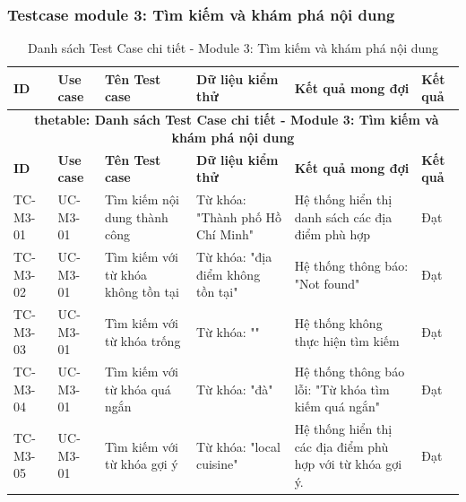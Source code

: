 \subsubsection{Testcase module 3: Tìm kiếm và khám phá nội dung}

\hypertarget{target:tc_m3}{}
\begin{landscape}
\small 
\begin{longtable}{|p{2.2cm}|p{2.2cm}|p{4cm}|p{4.5cm}|p{6cm}|p{2cm}|}
    
\caption{Danh sách Test Case chi tiết - Module 3: Tìm kiếm và khám phá nội dung} \label{tab:tc_module3} \\
\hline
\textbf{ID} & \textbf{ Use case} & \textbf{Tên Test case} & \textbf{Dữ liệu kiểm thử} & \textbf{Kết quả mong đợi} & \textbf{Kết quả } \\
\hline
\endfirsthead

\multicolumn{6}{c}{{\bfseries \tablename\ thetable{}: Danh sách Test Case chi tiết - Module 3: Tìm kiếm và khám phá nội dung}} \\
\hline
\textbf{ID} & \textbf{ Use case} & \textbf{Tên Test case} & \textbf{Dữ liệu kiểm thử} & \textbf{Kết quả mong đợi} & \textbf{Kết quả } \\
\hline
\endhead

\hline
\endlastfoot


TC-M3-01 & UC-M3-01 & Tìm kiếm nội dung thành công & 
Từ khóa: "Thành phố Hồ Chí Minh" & 
Hệ thống hiển thị danh sách các địa điểm phù hợp & Đạt\\
\hline

TC-M3-02 & UC-M3-01 & Tìm kiếm với từ khóa không tồn tại & 
Từ khóa: "địa điểm không tồn tại" & 
Hệ thống thông báo: "Not found" & Đạt \\
\hline

TC-M3-03 & UC-M3-01 & Tìm kiếm với từ khóa trống & 
Từ khóa: "" & 
Hệ thống không thực hiện tìm kiếm & Đạt\\
\hline

TC-M3-04 & UC-M3-01 & Tìm kiếm với từ khóa quá ngắn & 
Từ khóa: "đà" & 
Hệ thống thông báo lỗi: "Từ khóa tìm kiếm quá ngắn" & Đạt \\
\hline

TC-M3-05 & UC-M3-01 & Tìm kiếm với từ khóa gợi ý & 
Từ khóa: "local cuisine" & 
Hệ thống hiển thị các địa điểm phù hợp với từ khóa gợi ý. & Đạt \\
\hline


\end{longtable}
\end{landscape}
